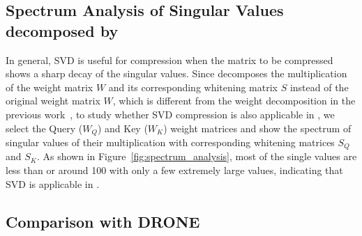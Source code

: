 
\subsection{Spectrum Analysis of Singular Values decomposed by \sysname}
\label{appendix:spectrum_analysis}
In general, SVD is useful for compression when the matrix to be compressed shows a sharp decay of the singular values. Since \sysname decomposes the multiplication of the weight matrix $W$ and its corresponding whitening matrix $S$ instead of the original weight matrix $W$, which is different from the weight decomposition in the previous work~\citep{DBLP:journals/corr/abs-2312-05821,DBLP:conf/iclr/HsuHCLSJ22}, to study whether SVD compression is also applicable in \sysname, we select the Query ($W_Q$) and Key ($W_K$) weight matrices and show the spectrum of singular values of their multiplication with corresponding whitening matrices $S_Q$ and $S_K$. As shown in Figure~\ref{fig:spectrum_analysis}, most of the single values are less than or around 100 with only a few extremely large values, indicating that SVD is applicable in \sysname.


\subsection{Comparison with DRONE}
\label{appendix:comparison_with_drone}

